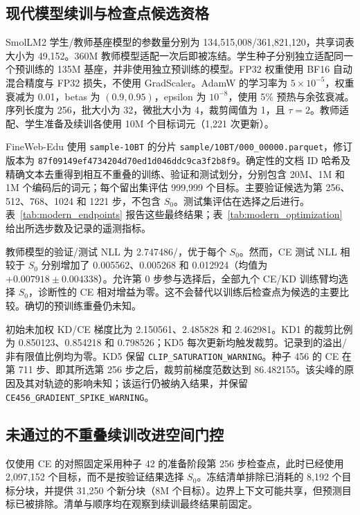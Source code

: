 \subsection{现代模型续训与检查点候选资格}
SmolLM2 学生/教师基座模型的参数量分别为 134,515,008/361,821,120，共享词表大小为 49,152。360M 教师模型适配一次后即被冻结。学生种子分别独立适配同一个预训练的 135M 基座，并非使用独立预训练的模型。FP32 权重使用 BF16 自动混合精度与 FP32 损失，不使用 GradScaler。AdamW 的学习率为 $5\times10^{-5}$，权重衰减为 0.01，betas 为 $(0.9,0.95)$，epsilon 为 $10^{-8}$，使用 5\% 预热与余弦衰减。序列长度为 256，批大小为 32，微批大小为 4，裁剪阈值为 1，且 $\tau=2$。教师适配、学生准备及续训各使用 10M 个目标词元（1,221 次更新）。

FineWeb-Edu 使用 \texttt{sample-10BT} 的分片 \texttt{sample/10BT/000\_00000.parquet}，修订版本为 \texttt{87f09149ef4734204d70e}\allowbreak\texttt{d1d046ddc9ca3f2b8f9}。确定性的文档 ID 哈希及精确文本去重得到相互不重叠的训练、验证和测试划分，分别包含 20M、1M 和 1M 个编码后的词元；每个留出集评估 999,999 个目标。主要验证候选为第 256、512、768、1024 和 1221 步，不包含 $S_0$。测试集评估在选择之后进行。表~\ref{tab:modern_endpoints} 报告这些最终结果；表~\ref{tab:modern_optimization} 给出所选步数及记录的遥测指标。

教师模型的验证/测试 NLL 为 2.747486/，优于每个 $S_0$。然而，CE 测试 NLL 相较于 $S_0$ 分别增加了 0.005562、0.005268 和 0.012924（均值为 $+0.007918\pm0.004338$）。允许第 0 步参与选择后，全部九个 CE/KD 训练臂均选择 $S_0$，诊断性的 CE 相对增益为零。这不会替代以训练后检查点为候选的主要比较。确切的预训练重叠仍未知。



初始未加权 KD/CE 梯度比为 2.150561、2.485828 和 2.462981。KD1 的裁剪比例为 0.850123、0.854218 和 0.798526；KD5 每次更新均触发裁剪。记录到的溢出/非有限值比例均为零。KD5 保留 \texttt{CLIP\_SATURATION\_WARNING}。种子 456 的 CE 在第 711 步、即其所选第 256 步之后，裁剪前梯度范数达到 86.482155。该尖峰的原因及其对轨迹的影响未知；该运行仍被纳入结果，并保留 \texttt{CE456\_GRADIENT\_SPIKE\_WARNING}。

\subsection{未通过的不重叠续训改进空间门控}
仅使用 CE 的对照固定采用种子 42 的准备阶段第 256 步检查点，此时已经使用 2,097,152 个目标，而不是按验证结果选择 $S_0$。冻结清单排除已消耗的 8,192 个目标分块，并提供 31,250 个新分块（8M 个目标）。边界上下文可能共享，但预测目标已被排除。清单与顺序均在观察到续训最终结果前固定。

